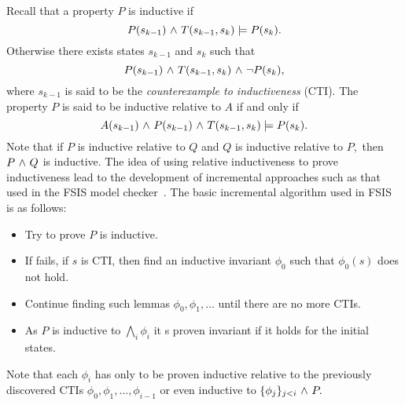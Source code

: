 Recall that a property $P$ is inductive if 
$$ P(s_{k-1}) {\ \wedge \ } T(s_{k-1},s_k) \models P(s_k). $$ Otherwise there
exists states $s_{k-1}$ and $s_k$ such that  
$$P(s_{k-1}) {\ \wedge \ } T(s_{k-1},s_k) {\ \wedge \ } {\neg} P(s_k),$$
where $s_{k-1}$ is said to be the {\em counterexample to
  inductiveness} (CTI). The property $P$ is said to be inductive
relative to $A$ if and only if
$$A(s_{k-1}) {\ \wedge \ }  P(s_{k-1}) {\ \wedge \ } T(s_{k-1},s_k) \models P(s_k). $$
Note that if $P$ is inductive relative to $Q$ and $Q$ is inductive
relative to $P,$ then $P {\ \wedge \ } Q$ is inductive.  The idea of using
relative inductiveness to prove inductiveness lead to the development
of incremental approaches such as that used in the FSIS model
checker~\cite{Bradley06, Bradley2011}.  The basic incremental
algorithm used in FSIS is as follows:
\begin{itemize}
\item Try to prove $P$ is inductive.
\item If fails,  if $s$ is CTI, then find an inductive invariant
  $\phi_0$ such that $\phi_0(s)$ does not hold. 
\item Continue finding such lemmas $\phi_0, \phi_1, \ldots$ until
  there are no more CTIs. 
\item As $P$ is inductive to $\bigwedge_{i} \phi_i$ it s proven
  invariant if it holds for the initial states.
\end{itemize}  
Note that each $\phi_i$ has only to be proven inductive relative to
the previously discovered CTIs $\phi_0, \phi_1, \ldots, \phi_{i-1}$
or even inductive to $\{ \phi_j \}_{j<i} {\ \wedge \ } P.$ 


